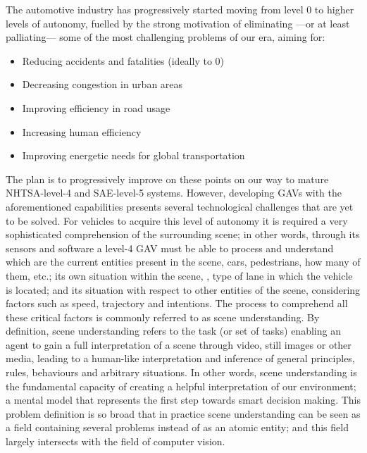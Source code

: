 The automotive industry has progressively started moving from level 0 to higher levels of autonomy, fuelled by the strong motivation of eliminating ---or at least palliating--- some of the most challenging problems of our era, aiming for:

\begin{itemize}
\item Reducing accidents and fatalities (ideally to 0)
\item Decreasing congestion in urban areas
\item Improving efficiency in road usage
\item Increasing human efficiency 
\item Improving energetic needs for global transportation
\end{itemize}

The plan is to progressively improve on these points on our way to mature NHTSA-level-4 and SAE-level-5 systems. However, developing GAVs with the aforementioned capabilities presents several technological challenges that are yet to be solved. For vehicles to acquire this level of autonomy it is required a very sophisticated comprehension of the surrounding scene; in other words, through its sensors and software a level-4 GAV must be able to process and understand which are the current entities present in the scene, \ie cars, pedestrians, how many of them, etc.; its own situation within the scene, \eg, type of lane in which the vehicle is located; and its situation with respect to other entities of the scene, considering factors such as speed, trajectory and intentions. The process to comprehend all these critical factors is commonly referred to as scene understanding. By definition, scene understanding refers to the task (or set of tasks) enabling an agent to gain a full interpretation of a scene through video, still images or other media, leading to a human-like interpretation and inference of general principles, rules, behaviours and arbitrary situations. In other words, scene understanding is the fundamental capacity of creating a helpful interpretation of our environment; a mental model that represents the first step towards smart decision making. This problem definition is so broad that in practice scene understanding can be seen as a field containing several problems instead of as an atomic entity; and this field largely intersects with the field of computer vision.

